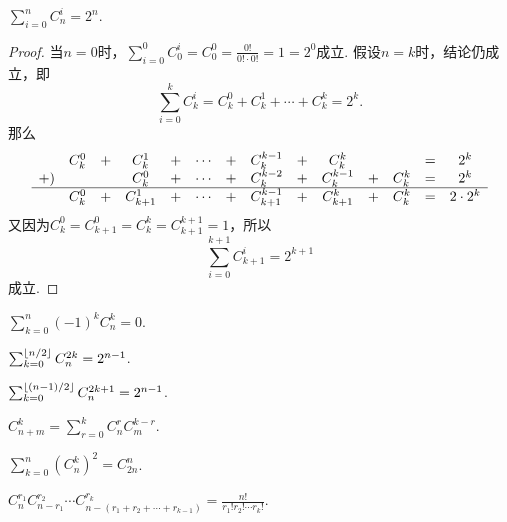 \begin{property}\label{theorem:组合数性质3}
\(\sum_{i=0}^n C_n^i = 2^n\).
\begin{proof}
当\(n=0\)时，\(\sum_{i=0}^0 C_0^i = C_0^0 = \frac{0!}{0! \cdot 0!} = 1 = 2^0\)成立.
假设\(n=k\)时，结论仍成立，即\begin{equation*}
\sum_{i=0}^k C_k^i
= C_k^0 + C_k^1 + \dotsb + C_k^k = 2^k.
\end{equation*}那么\begin{equation*}
\begin{array}{*{14}{c}}
& C_k^0 &+& C_k^1 &+& \dotsb &+& C_k^{k-1} &+& C_k^k && &=& 2^k \\
+) & && C_k^0 &+& \dotsb &+& C_k^{k-2} &+& C_k^{k-1} &+& C_k^k &=& 2^k \\ \hline
& C_k^0 &+& C_{k+1}^1 &+& \dotsb &+& C_{k+1}^{k-1} &+& C_{k+1}^k &+& C_k^k &=& 2 \cdot 2^k
\end{array}
\end{equation*}又因为\(C_k^0 = C_{k+1}^0 = C_k^k = C_{k+1}^{k+1} = 1\)，所以\begin{equation*}
\sum_{i=0}^{k+1} C_{k+1}^i = 2^{k+1}
\end{equation*}成立.
\end{proof}
\end{property}

\begin{property}\label{theorem:组合数性质4}
\(\sum_{k=0}^n (-1)^k C_n^k = 0\).
\end{property}

\begin{property}\label{theorem:组合数性质5}
\(\sum_{k=0}^{\lfloor n/2\rfloor} C_n^{2k} = 2^{n-1}\).
\end{property}
\begin{property}\label{theorem:组合数性质6}
\(\sum_{k=0}^{\lfloor(n-1)/2\rfloor} C_n^{2k+1} = 2^{n-1}\).
\end{property}

\begin{property}\label{theorem:组合数性质7}
\(C_{n+m}^k = \sum_{r=0}^{k} C_n^r C_m^{k-r}\).
\end{property}

\begin{property}\label{theorem:组合数性质8}
\(\sum_{k=0}^n (C_n^k)^2 = C_{2n}^n\).
\end{property}

\begin{property}\label{theorem:组合数性质9}
\(C_n^{r_1} C_{n-r_1}^{r_2} \dotsm C_{n-(r_1+r_2+\dotsb+r_{k-1})}^{r_k}
= \frac{n!}{r_1! r_2! \dotsm r_k!}\).
\end{property}


